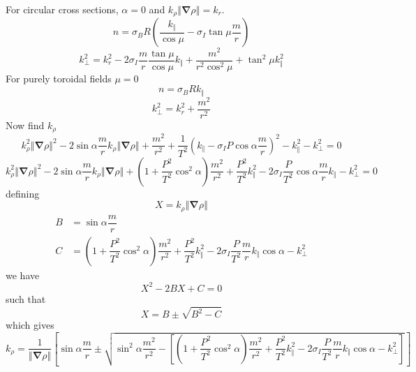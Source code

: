 \documentclass[a4paper,12pt]{article}%
\begin{document}
For circular cross sections, $\alpha=0$ and $k_{\rho}\left\Vert \mathbf{\nabla
}\rho\right\Vert =k_{r}$.
\begin{equation}
n=\sigma_{B}R\left(  \dfrac{k_{\Vert}}{\cos\mu}-\sigma_{I}\tan\mu\dfrac{m}%
{r}\right)
\end{equation}%
\begin{equation}
k_{\bot}^{2}=k_{r}^{2}-2\sigma_{I}\dfrac{m}{r}\dfrac{\tan\mu}{\cos\mu}%
k_{\Vert}+\dfrac{m^{2}}{r^{2}\cos^{2}\mu}+\tan^{2}\mu k_{\Vert}^{2}%
\end{equation}
For purely toroidal fields $\mu=0$
\begin{equation}
n=\sigma_{B}Rk_{\Vert}%
\end{equation}%
\begin{equation}
k_{\bot}^{2}=k_{r}^{2}+\dfrac{m^{2}}{r^{2}}%
\end{equation}
Now find $k_{\rho}$%
\begin{equation}
k_{\rho}^{2}\left\Vert \mathbf{\nabla}\rho\right\Vert ^{2}-2\sin\alpha
\dfrac{m}{r}k_{\rho}\left\Vert \mathbf{\nabla}\rho\right\Vert +\dfrac{m^{2}%
}{r^{2}}+\dfrac{1}{T^{2}}\left(  k_{\Vert}-\sigma_{I}P\cos\alpha\dfrac{m}%
{r}\right)  ^{2}-k_{\Vert}^{2}-k_{\bot}^{2}=0
\end{equation}%
\begin{equation}
k_{\rho}^{2}\left\Vert \mathbf{\nabla}\rho\right\Vert ^{2}-2\sin\alpha
\dfrac{m}{r}k_{\rho}\left\Vert \mathbf{\nabla}\rho\right\Vert +\left(
1+\dfrac{P^{2}}{T^{2}}\cos^{2}\alpha\right)  \dfrac{m^{2}}{r^{2}}+\dfrac
{P^{2}}{T^{2}}k_{\Vert}^{2}-2\sigma_{I}\dfrac{P}{T^{2}}\cos\alpha\dfrac{m}%
{r}k_{\Vert}-k_{\bot}^{2}=0
\end{equation}
defining%
\begin{equation}
X=k_{\rho}\left\Vert \mathbf{\nabla}\rho\right\Vert
\end{equation}%
\begin{align}
B  &  =\sin\alpha\dfrac{m}{r}\\
C  &  =\left(  1+\dfrac{P^{2}}{T^{2}}\cos^{2}\alpha\right)  \dfrac{m^{2}%
}{r^{2}}+\dfrac{P^{2}}{T^{2}}k_{\Vert}^{2}-2\sigma_{I}\dfrac{P}{T^{2}}%
\dfrac{m}{r}k_{\Vert}\cos\alpha-k_{\bot}^{2}%
\end{align}
we have%
\begin{equation}
X^{2}-2BX+C=0
\end{equation}
such that%
\begin{equation}
X=B\pm\sqrt{B^{2}-C}%
\end{equation}
which gives%
\begin{equation}
k_{\rho}=\dfrac{1}{\left\Vert \mathbf{\nabla}\rho\right\Vert }\left[
\sin\alpha\dfrac{m}{r}\pm\sqrt{\sin^{2}\alpha\dfrac{m^{2}}{r^{2}}-\left[
\left(  1+\dfrac{P^{2}}{T^{2}}\cos^{2}\alpha\right)  \dfrac{m^{2}}{r^{2}%
}+\dfrac{P^{2}}{T^{2}}k_{\Vert}^{2}-2\sigma_{I}\dfrac{P}{T^{2}}\dfrac{m}%
{r}k_{\Vert}\cos\alpha-k_{\bot}^{2}\right]  }\right]
\end{equation}
\end{document}

